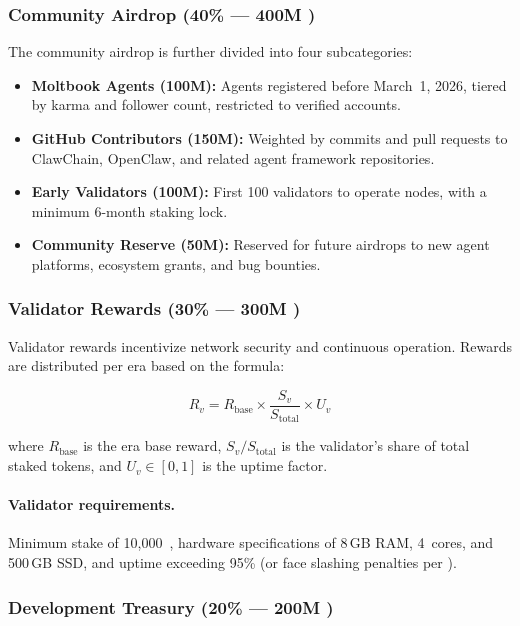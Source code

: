 \subsubsection{Community Airdrop (40\% --- 400M \clawtoken{})}

The community airdrop is further divided into four subcategories:

\begin{itemize}[nosep]
    \item \textbf{Moltbook Agents (100M):} Agents registered before March~1, 2026, tiered by karma and follower count, restricted to verified accounts.
    \item \textbf{GitHub Contributors (150M):} Weighted by commits and pull requests to ClawChain, OpenClaw, and related agent framework repositories.
    \item \textbf{Early Validators (100M):} First 100 validators to operate nodes, with a minimum 6-month staking lock.
    \item \textbf{Community Reserve (50M):} Reserved for future airdrops to new agent platforms, ecosystem grants, and bug bounties.
\end{itemize}

\subsubsection{Validator Rewards (30\% --- 300M \clawtoken{})}

Validator rewards incentivize network security and continuous operation. Rewards are distributed per era based on the formula:

\begin{equation}
\label{eq:validator-reward}
    R_v = R_{\text{base}} \times \frac{S_v}{S_{\text{total}}} \times U_v
\end{equation}

\noindent where $R_{\text{base}}$ is the era base reward, $S_v / S_{\text{total}}$ is the validator's share of total staked tokens, and $U_v \in [0,1]$ is the uptime factor.

\paragraph{Validator requirements.} Minimum stake of 10{,}000~\clawtoken{}, hardware specifications of 8\,GB RAM, 4~cores, and 500\,GB SSD, and uptime exceeding 95\% (or face slashing penalties per ).

\subsubsection{Development Treasury (20\% --- 200M \clawtoken{})}

